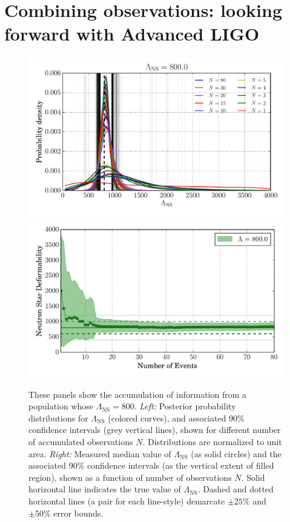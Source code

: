 \documentclass[aps,prd,amsmath,floats,floatfix, twocolumn,
superscriptaddress,nofootinbib,showpacs]{revtex4-1}
\newcommand{\lambdans}{\Lambda_\mathrm{NS}}
\begin{document}
\section{Combining observations: looking forward with Advanced LIGO}\label{s1:multiple_observations}
% 
\begin{figure}
\centering    
\includegraphics[width=1.05\columnwidth]{plots/pdfLambda_vs_N_L800.pdf}
\includegraphics[width=1.\columnwidth]{plots/FillBetweenErrorBarsLambda_vs_N_L800.pdf}
\caption{%
These panels show the accumulation of information from a population whose
$\lambdans=800$.
{\it Left:} Posterior probability distributions for $\lambdans$ (colored 
curves), and associated $90\%$ confidence intervals (grey vertical lines),
shown for different number of accumulated observations $N$. Distributions are
normalized to unit area.
{\it Right:} Measured median value of $\lambdans$ (as solid circles) and the 
associated $90\%$ confidence intervals (as the vertical extent of filled
region), shown as a function of number of observations $N$. Solid horizontal
line indicates the true value of $\lambdans$. Dashed and dotted horizontal
lines (a pair for each line-style) demarcate $\pm 25\%$ and $\pm 50\%$ error
bounds.
}
\label{fig:TT_Lambda_vs_N_L800_CI90_0}
\end{figure}
\end{document}
